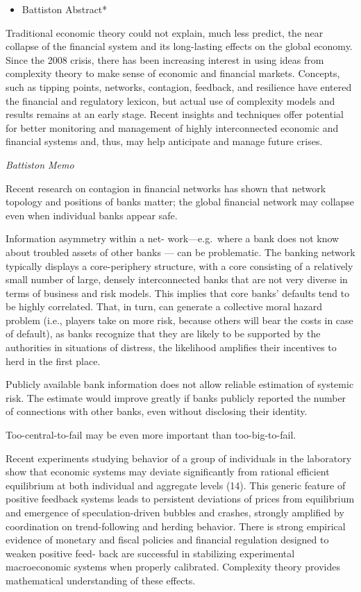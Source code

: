 \documentclass[
]{book}
\providecommand{\tightlist}{%
  \setlength{\itemsep}{0pt}\setlength{\parskip}{0pt}}
\begin{document}
\begin{itemize}
\tightlist
\item
  Battiston Abstract*
\end{itemize}

Traditional economic theory could not explain, much less predict, the near collapse of the financial system and its long-lasting effects on the global economy. Since the 2008 crisis, there has been increasing interest in using ideas from complexity theory to make sense of economic and financial markets. Concepts, such as tipping points, networks, contagion, feedback, and resilience have entered the financial and regulatory lexicon, but actual use of complexity models and results remains at an early stage. Recent insights and techniques offer potential for better monitoring and management of highly interconnected economic and financial systems and, thus, may help anticipate and manage future crises.

\emph{Battiston Memo}

Recent research on contagion in
financial networks has shown that network
topology and positions of banks matter; the
global financial network may collapse even
when individual banks appear safe.

Information asymmetry within a net-
work---e.g.~where a bank does not know
about troubled assets of other banks --- can
be problematic. The banking network typically displays a core-periphery structure,
with a core consisting of a relatively small
number of large, densely interconnected
banks that are not very diverse in terms of
business and risk models. This implies that
core banks' defaults tend to be highly correlated.
That, in turn, can generate a collective moral hazard problem (i.e., players
take on more risk, because others will bear
the costs in case of default), as banks recognize
that they are likely to be supported by
the authorities in situations of distress, the
likelihood amplifies their incentives to herd
in the first place.

Publicly available bank information does not allow reliable estimation of systemic risk. The
estimate would improve greatly if banks
publicly reported the number of connections with other banks, even without
disclosing their identity.

Too-central-to-fail may be even more important than
too-big-to-fail.

Recent experiments studying behavior
of a group of individuals in the laboratory
show that economic systems may deviate
significantly from rational efficient equilibrium at both individual and aggregate
levels (14). This generic feature of positive
feedback systems leads to persistent deviations
of prices from equilibrium and emergence of speculation-driven bubbles and
crashes, strongly amplified by coordination
on trend-following and herding behavior.
There is strong empirical evidence of
monetary and fiscal policies and financial
regulation designed to weaken positive feed-
back are successful in stabilizing experimental
macroeconomic systems when properly
calibrated. Complexity theory provides
mathematical understanding of these effects.
\end{document}
